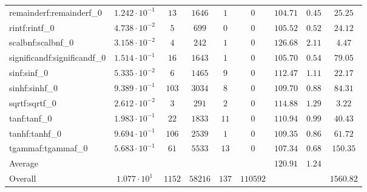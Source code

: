 \begin{tabular}{|l|c|c|c|c|c|c|c|c|}
remainderf:remainderf\_0     & $ 1.242 \cdot 10^{-1} $ & $ 13     $ & $ 1646  $ & $ 1   $ & $ 0      $ & $ 104.71      $ & $ 0.45    $ & $ 25.25   $ \\
rintf:rintf\_0               & $ 4.738 \cdot 10^{-2} $ & $ 5      $ & $ 699   $ & $ 0   $ & $ 0      $ & $ 105.52      $ & $ 0.52    $ & $ 24.12   $ \\
scalbnf:scalbnf\_0           & $ 3.158 \cdot 10^{-2} $ & $ 4      $ & $ 242   $ & $ 1   $ & $ 0      $ & $ 126.68      $ & $ 2.11    $ & $ 4.47    $ \\
significandf:significandf\_0 & $ 1.514 \cdot 10^{-1} $ & $ 16     $ & $ 1643  $ & $ 1   $ & $ 0      $ & $ 105.70      $ & $ 0.54    $ & $ 79.05   $ \\
sinf:sinf\_0                 & $ 5.335 \cdot 10^{-2} $ & $ 6      $ & $ 1465  $ & $ 9   $ & $ 0      $ & $ 112.47      $ & $ 1.11    $ & $ 22.17   $ \\
sinhf:sinhf\_0               & $ 9.389 \cdot 10^{-1} $ & $ 103    $ & $ 3034  $ & $ 8   $ & $ 0      $ & $ 109.70      $ & $ 0.88    $ & $ 84.31   $ \\
sqrtf:sqrtf\_0               & $ 2.612 \cdot 10^{-2} $ & $ 3      $ & $ 291   $ & $ 2   $ & $ 0      $ & $ 114.88      $ & $ 1.29    $ & $ 3.22    $ \\
tanf:tanf\_0                 & $ 1.983 \cdot 10^{-1} $ & $ 22     $ & $ 1833  $ & $ 11  $ & $ 0      $ & $ 110.94      $ & $ 0.99    $ & $ 40.43   $ \\
tanhf:tanhf\_0               & $ 9.694 \cdot 10^{-1} $ & $ 106    $ & $ 2539  $ & $ 1   $ & $ 0      $ & $ 109.35      $ & $ 0.86    $ & $ 61.72   $ \\
tgammaf:tgammaf\_0           & $ 5.683 \cdot 10^{-1} $ & $ 61     $ & $ 5533  $ & $ 13  $ & $ 0      $ & $ 107.34      $ & $ 0.68    $ & $ 150.35  $ \\
\hline
Average                      & $                     $ & $        $ & $       $ & $     $ & $        $ & $ 120.91      $ & $ 1.24    $ & $         $ \\
\hline
Overall                      & $ 1.077 \cdot 10^{1}  $ & $ 1152   $ & $ 58216 $ & $ 137 $ & $ 110592 $ & $             $ & $         $ & $ 1560.82 $ \\
\hline
\end{tabular}
